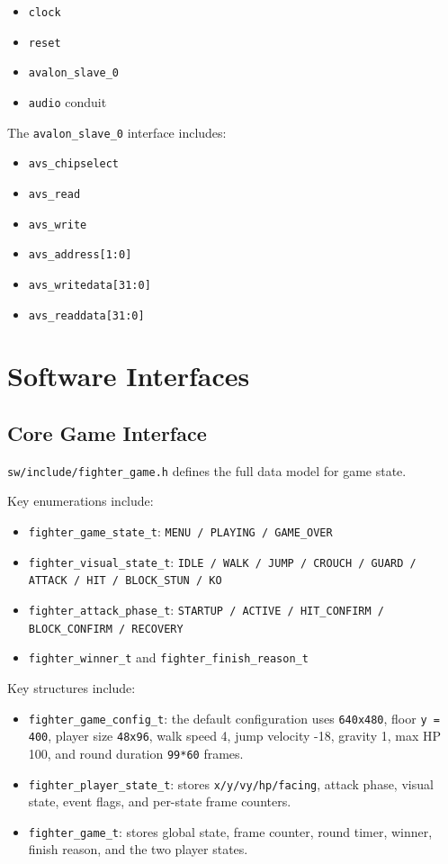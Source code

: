 \documentclass[12pt,a4paper]{article}
\begin{document}
\begin{itemize}
  \item \texttt{clock}
  \item \texttt{reset}
  \item \texttt{avalon\_slave\_0}
  \item \texttt{audio} conduit
\end{itemize}

The \texttt{avalon\_slave\_0} interface includes:

\begin{itemize}
  \item \texttt{avs\_chipselect}
  \item \texttt{avs\_read}
  \item \texttt{avs\_write}
  \item \texttt{avs\_address[1:0]}
  \item \texttt{avs\_writedata[31:0]}
  \item \texttt{avs\_readdata[31:0]}
\end{itemize}

\section{Software Interfaces}

\subsection{Core Game Interface}

\texttt{sw/include/fighter\_game.h} defines the full data model for game state.

Key enumerations include:

\begin{itemize}
  \item \texttt{fighter\_game\_state\_t}: \texttt{MENU / PLAYING / GAME\_OVER}
  \item \texttt{fighter\_visual\_state\_t}: \texttt{IDLE / WALK / JUMP / CROUCH / GUARD / ATTACK / HIT / BLOCK\_STUN / KO}
  \item \texttt{fighter\_attack\_phase\_t}: \texttt{STARTUP / ACTIVE / HIT\_CONFIRM / BLOCK\_CONFIRM / RECOVERY}
  \item \texttt{fighter\_winner\_t} and \texttt{fighter\_finish\_reason\_t}
\end{itemize}

Key structures include:

\begin{itemize}
  \item \texttt{fighter\_game\_config\_t}: the default configuration uses \texttt{640x480}, floor \texttt{y = 400}, player size \texttt{48x96}, walk speed 4, jump velocity -18, gravity 1, max HP 100, and round duration \texttt{99*60} frames.
  \item \texttt{fighter\_player\_state\_t}: stores \texttt{x/y/vy/hp/facing}, attack phase, visual state, event flags, and per-state frame counters.
  \item \texttt{fighter\_game\_t}: stores global state, frame counter, round timer, winner, finish reason, and the two player states.
\end{itemize}
\end{document}
